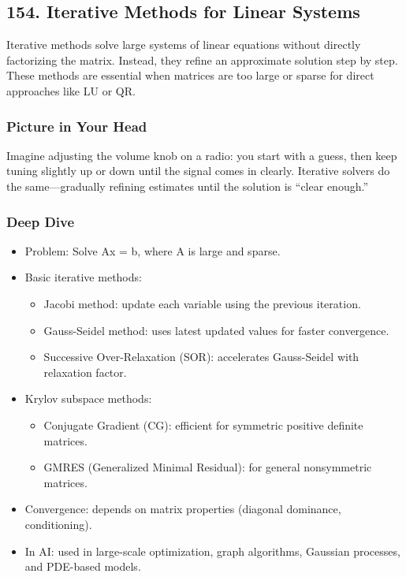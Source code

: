 \documentclass[
  letterpaper,
  DIV=11,
  numbers=noendperiod]{scrreprt}
\providecommand{\tightlist}{%
  \setlength{\itemsep}{0pt}\setlength{\parskip}{0pt}}
\begin{document}
\subsection{154. Iterative Methods for Linear
Systems}\label{iterative-methods-for-linear-systems}

Iterative methods solve large systems of linear equations without
directly factorizing the matrix. Instead, they refine an approximate
solution step by step. These methods are essential when matrices are too
large or sparse for direct approaches like LU or QR.

\subsubsection{Picture in Your Head}\label{picture-in-your-head-153}

Imagine adjusting the volume knob on a radio: you start with a guess,
then keep tuning slightly up or down until the signal comes in clearly.
Iterative solvers do the same---gradually refining estimates until the
solution is ``clear enough.''

\subsubsection{Deep Dive}\label{deep-dive-153}

\begin{itemize}
\item
  Problem: Solve Ax = b, where A is large and sparse.
\item
  Basic iterative methods:

  \begin{itemize}
  \tightlist
  \item
    Jacobi method: update each variable using the previous iteration.
  \item
    Gauss-Seidel method: uses latest updated values for faster
    convergence.
  \item
    Successive Over-Relaxation (SOR): accelerates Gauss-Seidel with
    relaxation factor.
  \end{itemize}
\item
  Krylov subspace methods:

  \begin{itemize}
  \tightlist
  \item
    Conjugate Gradient (CG): efficient for symmetric positive definite
    matrices.
  \item
    GMRES (Generalized Minimal Residual): for general nonsymmetric
    matrices.
  \end{itemize}
\item
  Convergence: depends on matrix properties (diagonal dominance,
  conditioning).
\item
  In AI: used in large-scale optimization, graph algorithms, Gaussian
  processes, and PDE-based models.
\end{itemize}
\end{document}
